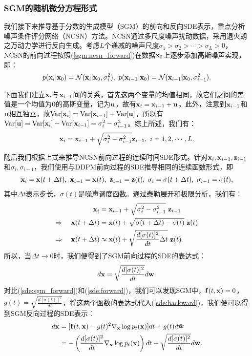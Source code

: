 \documentclass[11pt,a4paper,UTF8]{ctexart}
\begin{document}
\subsubsection{SGM的随机微分方程形式}

我们接下来推导基于分数的生成模型（SGM）的前向和反向SDE表示，重点分析噪声条件评分网络（NCSN）方法\cite{song2020score}。NCSN通过多尺度噪声扰动数据，采用退火朗之万动力学进行反向生成。考虑$L$个递减的噪声尺度$\sigma_1 > \sigma_2 > \cdots > \sigma_L > 0$，NCSN的前向过程按照(\ref{sgm:ncsn_forward})在数据$\mathbf{x}_0$上逐步添加高斯噪声实现，即：
\begin{equation*}
    p(\x_i|\x_0) =\N(\x_i|\x_0,\sigma_i^2),\ p(\x_{i-1}|\x_0) =\N(\x_{i-1}|\x_0,\sigma_{i-1}^2).
\end{equation*}

下面我们建立$\mathbf{x}_i$与$\mathbf{x}_{i-1}$间的关系，首先这两个变量的均值相同，故它们之间的差值是一个均值为$\mathbf{0}$的高斯变量，记为$\mathbf{u}$，故有$\mathbf{x}_i=\mathbf{x}_{i-1}+\mathbf{u}$。此外，注意到$\mathbf{x}_{i-1}$和$\mathbf{u}$相互独立，故$\text{Var}[\mathbf{x}_i]=\text{Var}[\mathbf{x}_{i-1}]+\text{Var}[\mathbf{u}]$，所以有$\text{Var}[\mathbf{u}]=\text{Var}[\mathbf{x}_i]-\text{Var}[\mathbf{x}_{i-1}]=\sigma_i^2-\sigma_{i-1}^2$。综上所述，我们有：
\begin{equation*}
    \mathbf{x}_i = \mathbf{x}_{i-1} + \sqrt{\sigma_i^2-\sigma_{i-1}^2} \mathbf{z}_{i-1},\ i=1,2,\cdots,L.
\end{equation*}

随后我们根据上式来推导NCSN前向过程的连续时间SDE形式。针对$\mathbf{x}_i,\mathbf{x}_{i-1},\mathbf{z}_{i-1}$和$\sigma_i,\sigma_{i-1}$，我们使用与DDPM前向过程的SDE推导相同的连续函数形式，即
\begin{equation*}
    \x_i=\x(t+\Delta t),\ \x_{i-1}=\x(t),\ \z_{i-1}=\z(t),\ \sigma_i = \sigma(t+\Delta t),\ \sigma_{i-1} = \sigma(t),
\end{equation*}
其中$\Delta t$表示步长，$\sigma(t)$是噪声调度函数。通过泰勒展开和极限分析，我们有：
\begin{align*}
    \mathbf{x}_i &= \mathbf{x}_{i-1} + \sqrt{\sigma_i^2-\sigma_{i-1}^2}\ \mathbf{z}_{i-1} \\
    \Rightarrow\quad \mathbf{x}(t+\Delta t) &=\mathbf{x}(t) + \sqrt{\sigma(t+\Delta t) -\sigma(t)}\ \mathbf{z}(t) \\
    \Rightarrow\quad \mathbf{x}(t+\Delta t) &\approx \mathbf{x}(t) + \sqrt{\frac{d[\sigma(t)]^2}{dt}\Delta t}\ \mathbf{z}(t).
\end{align*}
所以，当$\Delta t\rightarrow 0$时，我们便得到了SGM前向过程的SDE的表达式：
\begin{equation}
    d\mathbf{x} = \sqrt{\frac{d[\sigma(t)]^2}{dt}}d\mathbf{w}.
\label{sde:sgm_forward}
\end{equation}
对比(\ref{sde:sgm_forward})和(\ref{sde:forward})，我们可以发现SGM中，$\mathbf{f}(t,\mathbf{x})=0$，$g(t)=\sqrt{\frac{d[\sigma(t)]^2}{dt}}$，将这两个函数的表达式代入(\ref{sde:backward})，我们便可以得到SGM反向过程的SDE表示：
\begin{align}
\begin{split}
    d\mathbf{x} &= [\mathbf{f}(t,\mathbf{x}) - g(t)^2 \nabla_{\mathbf{x}} \log p_t(\mathbf{x}) ]dt + g(t)d\bar{\mathbf{w}} \\
    &= -\left(\frac{d[\sigma(t)]^2}{dt} \nabla_{\mathbf{x}} \log p_t(\mathbf{x}) \right)dt + \sqrt{\frac{d[\sigma(t)]^2}{dt}} d\bar{\mathbf{w}}.
\end{split} 
\label{sde:sgm_backward}
\end{align}
\end{document}
